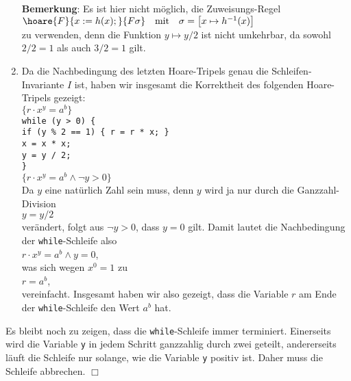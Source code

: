 \begin{enumerate}
      \textbf{Bemerkung}:  Es ist hier nicht m\"oglich, die Zuweisungs-Regel
      \\[0.2cm]
      \hspace*{1.3cm}
      $\hoare{F}{x := h(x);}{F\sigma} \quad \mathrm{mit} \quad \sigma = \bigl[x \mapsto h^{-1}(x)\bigr]$
      \\[0.2cm]
      zu verwenden, denn die Funktion $y \mapsto y/2$ ist nicht umkehrbar, da
      sowohl $2/2 = 1$ als auch $3/2 = 1$ gilt.
\item Da  die Nachbedingung des letzten Hoare-Tripels  genau die Schleifen-Invariante $I$
      ist, haben wir insgesamt die Korrektheit des  folgenden Hoare-Tripels gezeigt: 
      \\[0.2cm]
      \hspace*{1.3cm} $\{ r \cdot x^y = a^b \}$                  \\[0.2cm]
      \hspace*{2.3cm} \texttt{while (y > 0) \{}                  \\
      \hspace*{2.8cm} \texttt{if (y \% 2 == 1) \{ r = r * x; \}}  \\
      \hspace*{2.8cm} \texttt{x = x * x;}                        \\
      \hspace*{2.8cm} \texttt{y = y / 2;}                        \\
      \hspace*{2.3cm} \texttt{\}}                                \\
      \hspace*{1.3cm} $\{ r \cdot x^y = a^b \wedge \neg y > 0\}$ \\[0.2cm]
      Da $y$ eine nat\"urlich Zahl sein muss, denn $y$ wird ja nur durch die
      Ganzzahl-Division 
      \\[0.2cm]
      \hspace*{1.3cm}
      $y = y / 2$
      \\[0.2cm]
      ver\"andert, folgt aus $\neg y > 0$, dass $y = 0$ gilt.  Damit lautet die Nachbedingung der
      \texttt{while}-Schleife also 
      \\[0.2cm]
      \hspace*{1.3cm} $r \cdot x^y = a^b \wedge y = 0$,
      \\[0.2cm]
      was sich wegen $x^0 = 1$ zu 
      \\[0.2cm]
      \hspace*{1.3cm}
      $r = a^b$,
      \\[0.2cm]
      vereinfacht.  Insgesamt haben wir also gezeigt, dass die Variable $r$ am Ende der
      \texttt{while}-Schleife den Wert $a^b$ hat.  
\end{enumerate}
Es bleibt noch zu zeigen, dass die \texttt{while}-Schleife immer terminiert.
Einerseits wird die Variable \texttt{y}  in jedem Schritt ganzzahlig durch zwei geteilt, andererseits
l\"auft die Schleife nur solange, wie die Variable \texttt{y} positiv ist.  Daher muss die
Schleife abbrechen.
\hspace*{\fill} $\Box$

